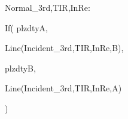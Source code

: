 Normal_{3rd,TIR,InRe}: 
  
  If(
    plzdtyA,
    
    Line(Incident_{3rd,TIR,InRe},B),

    plzdtyB,

    Line(Incident_{3rd,TIR,InRe},A)

  )